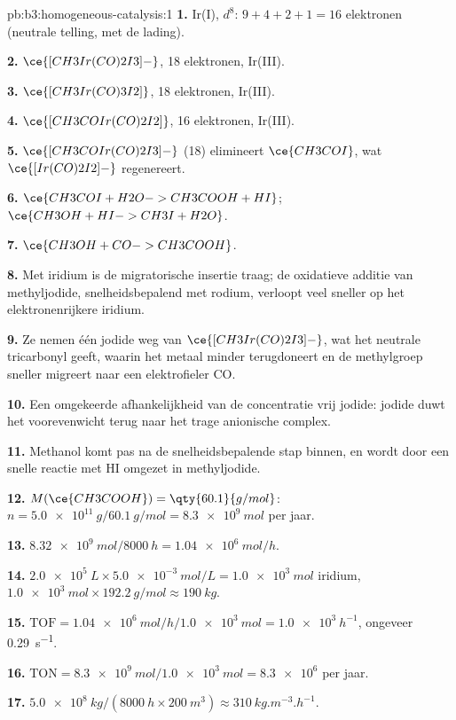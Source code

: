 \begin{solution}{pb:b3:homogeneous-catalysis:1}
\textbf{1.} Ir(I), $d^8$: $9 + 4 + 2 + 1 = 16$ elektronen (neutrale telling, met de lading).

\textbf{2.} $\ce{[CH3Ir(CO)2I3]-}$, 18 elektronen, Ir(III).

\textbf{3.} $\ce{[CH3Ir(CO)3I2]}$, 18 elektronen, Ir(III).

\textbf{4.} $\ce{[CH3COIr(CO)2I2]}$, 16 elektronen, Ir(III).

\textbf{5.} $\ce{[CH3COIr(CO)2I3]-}$ (18) elimineert $\ce{CH3COI}$, wat $\ce{[Ir(CO)2I2]-}$ regenereert.

\textbf{6.} $\ce{CH3COI + H2O -> CH3COOH + HI}$; $\ce{CH3OH + HI -> CH3I + H2O}$.

\textbf{7.} $\ce{CH3OH + CO -> CH3COOH}$.

\textbf{8.} Met iridium is de migratorische insertie traag; de oxidatieve
additie van methyljodide, snelheidsbepalend met rodium, verloopt veel
sneller op het elektronenrijkere iridium.

\textbf{9.} Ze nemen één jodide weg van $\ce{[CH3Ir(CO)2I3]-}$, wat het neutrale tricarbonyl geeft, waarin
het metaal minder terugdoneert en de methylgroep sneller migreert naar
een elektrofieler CO.

\textbf{10.} Een omgekeerde afhankelijkheid van de concentratie vrij
jodide: jodide duwt het voorevenwicht terug naar het trage anionische
complex.

\textbf{11.} Methanol komt pas na de snelheidsbepalende stap binnen, en
wordt door een snelle reactie met HI omgezet in methyljodide.

\textbf{12.} $M(\ce{CH3COOH}) = \qty{60.1}{g/mol}$: $n = \qty{5.0e11}{g}/\qty{60.1}{g/mol} = \qty{8.3e9}{mol}$ per jaar.

\textbf{13.} $\qty{8.32e9}{mol}/\qty{8000}{h} = \qty{1.04e6}{mol/h}$.

\textbf{14.} $\qty{2.0e5}{L} \times \qty{5.0e-3}{mol/L} = \qty{1.0e3}{mol}$ iridium, $\qty{1.0e3}{mol} \times \qty{192.2}{g/mol} \approx \qty{190}{kg}$.

\textbf{15.} $\mathrm{TOF} = \qty{1.04e6}{mol/h}/\qty{1.0e3}{mol} = \qty{1.0e3}{h^{-1}}$, ongeveer \qty{0.29}{s^{-1}}.

\textbf{16.} $\mathrm{TON} = \qty{8.3e9}{mol}/\qty{1.0e3}{mol} = \num{8.3e6}$ per jaar.

\textbf{17.} $\qty{5.0e8}{kg}/(\qty{8000}{h} \times \qty{200}{m^3}) \approx \qty{310}{kg.m^{-3}.h^{-1}}$.


\end{solution}

